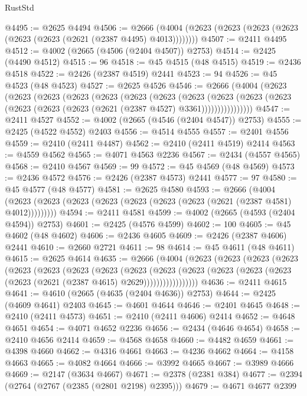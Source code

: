 \begin{lexlean}{RustStd}
\begin{coremodule}
@4495 := @2625 @4494
@4506 := @2666 (@4004 (@2623 (@2623 (@2623 (@2623 (@2623 (@2623 (@2621 (@2387 @4495) @4013))))))))
@4507 := @2411 @4495
@4512 := @4002 (@2665 (@4506 (@2404 @4507)) @2753)
@4514 := @2425 (@4490 @4512)
@4515 := 96
@4518 := @45 @4515 (@48 @4515)
@4519 := @2436 @4518
@4522 := @2426 (@2387 @4519) @2441
@4523 := 94
@4526 := @45 @4523 (@48 @4523)
@4527 := @2625 @4526
@4546 := @2666
    (@4004
      (@2623
        (@2623
          (@2623
            (@2623
              (@2623
                (@2623
                  (@2623
                    (@2623
                      (@2623
                        (@2623
                          (@2623 (@2623 (@2623 (@2623 (@2621 (@2387 @4527) @3361))))))))))))))))
@4547 := @2411 @4527
@4552 := @4002 (@2665 (@4546 (@2404 @4547)) @2753)
@4555 := @2425 (@4522 @4552) @2403
@4556 := @4514 @4555
@4557 := @2401 @4556
@4559 := @2410 (@2411 @4487)
@4562 := @2410 (@2411 @4519) @2414
@4563 := @4559 @4562
@4565 := @4071 @4563 @2236
@4567 := @2434 (@4557 @4565)
@4568 := @2410 @4567
@4569 := 99
@4572 := @45 @4569 (@48 @4569)
@4573 := @2436 @4572
@4576 := @2426 (@2387 @4573) @2441
@4577 := 97
@4580 := @45 @4577 (@48 @4577)
@4581 := @2625 @4580
@4593 := @2666
    (@4004 (@2623 (@2623 (@2623 (@2623 (@2623 (@2623 (@2623 (@2621 (@2387 @4581) @4012)))))))))
@4594 := @2411 @4581
@4599 := @4002 (@2665 (@4593 (@2404 @4594)) @2753)
@4601 := @2425 (@4576 @4599)
@4602 := 100
@4605 := @45 @4602 (@48 @4602)
@4606 := @2436 @4605
@4609 := @2426 (@2387 @4606) @2441
@4610 := @2660 @2721
@4611 := 98
@4614 := @45 @4611 (@48 @4611)
@4615 := @2625 @4614
@4635 := @2666
    (@4004
      (@2623
        (@2623
          (@2623
            (@2623
              (@2623
                (@2623
                  (@2623
                    (@2623
                      (@2623
                        (@2623
                          (@2623
                            (@2623 (@2623 (@2623 (@2623 (@2621 (@2387 @4615) @2629)))))))))))))))))
@4636 := @2411 @4615
@4641 := @4610 (@2665 (@4635 (@2404 @4636)) @2753)
@4644 := @2425 (@4609 @4641) @2403
@4645 := @4601 @4644
@4646 := @2401 @4645
@4648 := @2410 (@2411 @4573)
@4651 := @2410 (@2411 @4606) @2414
@4652 := @4648 @4651
@4654 := @4071 @4652 @2236
@4656 := @2434 (@4646 @4654)
@4658 := @2410 @4656 @2414
@4659 := @4568 @4658
@4660 := @4482 @4659
@4661 := @4398 @4660
@4662 := @4316 @4661
@4663 := @4236 @4662
@4664 := @4158 @4663
@4665 := @4082 @4664
@4666 := @3992 @4665
@4667 := @3989 @4666
@4669 := @2147 (@3634 @4667)
@4671 := @2378 (@2381 @384)
@4677 := @2394 (@2764 (@2767 (@2385 (@2801 @2198) @2395)))
@4679 := @4671 @4677 @2399

\end{coremodule}
\end{lexlean}
